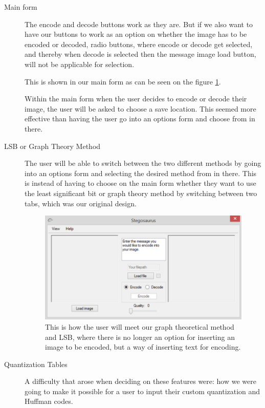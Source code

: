 \begin{description}
\item[Main form]
The encode and decode buttons work as they are.
But if we also want to have our buttons to work as an option on whether the image has to be encoded or decoded, radio buttons, where encode or decode get selected, and thereby when decode is selected then the message image load button, will not be applicable for selection.

This is shown in our main form as can be seen on the figure \ref{fig:StegoMainForm}.

Within the main form when the user decides to encode or decode their image, the user will be asked to choose a save location. This seemed more effective than having the user go into an options form and choose from in there.

\item[LSB or Graph Theory Method]
The user will be able to switch between the two different methods by going into an options form and selecting the desired method from in there. This is instead of having to choose on the main form whether they want to use the least significant bit or graph theory method by switching between two tabs, which was our original design.

\begin{figure}
	\centering
	\includegraphics[width=1\textwidth]{figures/StegoMainForm.png}
	\caption{This is how the user will meet our graph theoretical method and LSB, where there is no longer an option for inserting an image to be encoded, but a way of inserting text for encoding.}
	\label{fig:StegoMainForm}
\end{figure}

\item[Quantization Tables]
A difficulty that arose when deciding on these features were: how we were going to make it possible for a user to input their custom quantization and Huffman codes.


\end{description}
